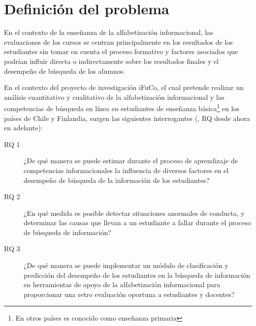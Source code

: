 \section{Definición del problema}
\label{sec:definicion_problema}

En el contexto de la enseñanza de la alfabetización informacional, las evaluaciones de los cursos se centran principalmente en los resultados de los estudiantes sin tomar en cuenta el proceso formativo y factores asociados que podrían influir directa o indirectamente sobre los resultados finales y el desempeño de búsqueda de los alumnos.  

En el contexto del proyecto de investigación iFuCo, el cual pretende realizar un análisis cuantitativo y cualitativo de la alfabetización informacional y las competencias de búsqueda en línea en estudiantes de enseñanza básica\footnote{En otros países es conocido como enseñanza primaria} en los países de Chile y Finlandia, surgen las siguientes interrogantes (, RQ desde ahora en adelante):

\begin{description}
	\item [RQ 1] ¿De qué manera se puede estimar durante el proceso de aprendizaje de competencias informacionales la influencia de diversos factores en el desempeño de búsqueda de la información de los estudiantes?
	\item [RQ 2] ¿En qué medida es posible detectar situaciones anormales de conducta, y determinar las causas que llevan a un estudiante a fallar durante el proceso de búsqueda de información? 
	\item [RQ 3] ¿De qué manera se puede implementar un módulo de clasificación y predicción del desempeño de los estudiantes en la búsqueda de información en herramientas de apoyo de la alfabetización informacional para proporcionar una retro evaluación oportuna a estudiantes y docentes?
\end{description}